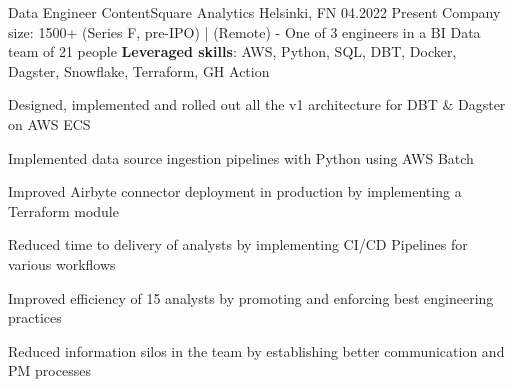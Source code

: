 

\begin{cventries}

\cventry
{Data Engineer} %
{ContentSquare} %
{Analytics} %
{Helsinki, FN} %
{04.2022} %
{Present} %
{Company size: 1500+ (Series F, pre-IPO) | (Remote) - One of 3 engineers in a BI Data team of 21 people} %
{\textbf{Leveraged skills}: AWS, Python, SQL, DBT, Docker, Dagster, Snowflake, Terraform, GH Action } %
{
  \begin{cvitems} %
    \item {Designed, implemented and rolled out all the v1 architecture for DBT \& Dagster on AWS ECS}
    \item {Implemented data source ingestion pipelines with Python using AWS Batch}
    \item {Improved Airbyte connector deployment in production by implementing a Terraform module}
    \item {Reduced time to delivery of analysts by implementing CI/CD Pipelines for various workflows}
    \item {Improved efficiency of 15 analysts by promoting and enforcing best engineering practices }
    \item {Reduced information silos in the team by establishing better communication and PM processes}
  \end{cvitems}
}


\end{cventries}
